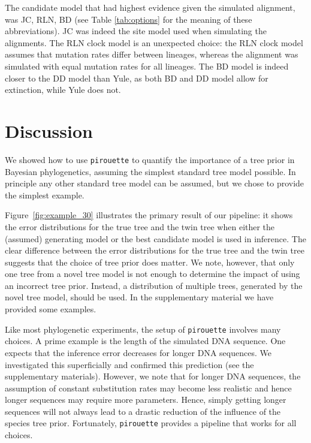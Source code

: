 The candidate model that had highest evidence given the simulated alignment,
was JC, RLN, BD (see Table \ref{tab:options} for the meaning of these 
abbreviations). JC was indeed the site model used when simulating the
alignments. The RLN clock model is an unexpected choice: the RLN clock
model assumes that mutation rates differ between lineages, whereas the
alignment was simulated with equal mutation rates for all lineages.
The BD model is indeed closer to the DD model than Yule, as both BD and DD
model allow for extinction, while Yule does not.

\section{Discussion}

We showed how to use \verb;pirouette; to quantify the importance of a 
tree prior in Bayesian phylogenetics, assuming the simplest standard 
tree model possible.
In principle any other standard tree model can be assumed, 
but we chose to provide the simplest example.

Figure~\ref{fig:example_30} illustrates the primary result of our pipeline: 
it shows the error distributions for the true tree and the twin tree 
when either the (assumed) generating model or the best candidate model is used in inference. 
The clear difference between the error distributions 
for the true tree and the twin tree suggests 
that the choice of tree prior does matter.
We note, however, that only one tree from a novel tree model
is not enough to determine the impact of using an incorrect
tree prior. Instead, a distribution 
of multiple trees, generated by the novel tree model, should be used. In the supplementary material we have provided some examples.

Like most phylogenetic experiments, the setup of \verb;pirouette;
involves many choices. A prime example is the
length of the simulated DNA sequence. One expects that the inference error
decreases for longer DNA sequences. We investigated this
superficially and confirmed this prediction (see the supplementary materials). 
However, we note that for longer DNA sequences, the assumption 
of constant substitution rates may become less realistic 
and hence longer sequences may require more parameters. 
Hence, simply getting longer sequences will not always lead to a drastic 
reduction of the influence of the species tree prior.
Fortunately, \verb;pirouette; provides a pipeline that works for all choices.

